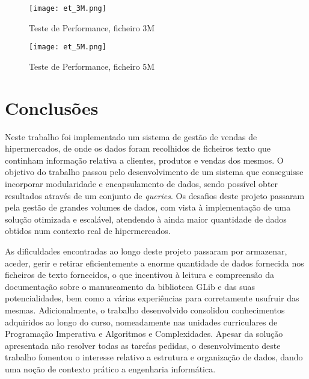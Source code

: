 \documentclass{article}
\begin{document}
\begin{figure}[H]
\texttt{[image: et\_3M.png]}
\centering
\caption{Teste de Performance, ficheiro 3M\label{fig:3MF}}
\end{figure}


\begin{figure}[H]
\texttt{[image: et\_5M.png]}
\centering
\caption{Teste de Performance, ficheiro 5M\label{fig:5MF}}
\end{figure}

\section{Conclusões}\label{sec:conclusoes}

Neste trabalho foi implementado um sistema de gestão de vendas de hipermercados, de onde os dados foram recolhidos de ficheiros texto que continham informação relativa a clientes, produtos e vendas dos mesmos. O objetivo do trabalho passou pelo desenvolvimento de um sistema que conseguisse incorporar modularidade e encapsulamento de dados, sendo possível obter resultados através de um conjunto de \textit{queries}. Os desafios deste projeto passaram pela gestão de grandes volumes de dados, com vista à implementação de uma solução otimizada e escalável, atendendo à ainda maior quantidade de dados obtidos num contexto real de hipermercados.  

As dificuldades encontradas ao longo deste projeto passaram por armazenar, aceder, gerir e retirar eficientemente a enorme quantidade de dados fornecida nos ficheiros de texto fornecidos, o que incentivou à leitura e compreensão da documentação sobre o manuseamento da biblioteca GLib e das suas potencialidades, bem como a várias experiências para corretamente usufruir das mesmas. 
Adicionalmente, o trabalho desenvolvido consolidou conhecimentos adquiridos ao longo do curso, nomeadamente nas unidades curriculares de Programação Imperativa e Algoritmos e Complexidades. Apesar da solução apresentada não resolver todas as tarefas pedidas, o desenvolvimento deste trabalho fomentou o interesse relativo a estrutura e organização de dados, dando uma noção de contexto prático a engenharia informática. 

\newpage
\renewcommand\refname{Bibliografia}
\nocite{*}


\end{document}
